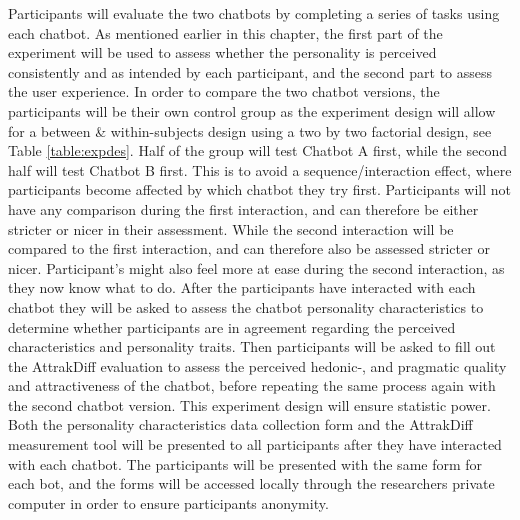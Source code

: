    Participants will evaluate the two chatbots by completing a series of tasks using each chatbot. As mentioned earlier in this chapter, the first part of the experiment will be used to assess whether the personality is perceived consistently and as intended by each participant, and the second part to assess the user experience. In order to compare the two chatbot versions, the participants will be their own control group as the experiment design will allow for a between \& within-subjects design using a two by two factorial design, see Table \ref{table:expdes}. Half of the group will test Chatbot A first, while the second half will test Chatbot B first. This is to avoid a sequence/interaction effect, where participants become affected by which chatbot they try first. Participants will not have any comparison during the first interaction, and can therefore be either stricter or nicer in their assessment. While the second interaction will be compared to the first interaction, and can therefore also be assessed stricter or nicer. Participant's might also feel more at ease during the second interaction, as they now know what to do. After the participants have interacted with each chatbot they will be asked to assess the chatbot personality characteristics to determine whether participants are in agreement regarding the perceived characteristics and personality traits. Then participants will be asked to fill out the AttrakDiff evaluation to assess the perceived hedonic-, and pragmatic quality and attractiveness of the chatbot, before repeating the same process again with the second chatbot version. This experiment design will ensure statistic power. Both the personality characteristics data collection form and the AttrakDiff measurement tool will be presented to all participants after they have interacted with each chatbot. The participants will be presented with the same form for each bot, and the forms will be accessed locally through the researchers private computer in order to ensure participants anonymity. 
  
    

